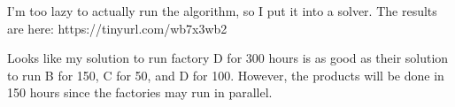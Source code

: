 \documentclass{article}
\begin{document}
I'm too lazy to actually run the algorithm, so I put it into a solver.  The results are here:  https://tinyurl.com/wb7x3wb2

Looks like my solution to run factory D for 300 hours is as good as their solution to run B for 150, C for 50, and D for 100.  However, the products will be done in 150 hours since the factories may run in parallel.
\end{document}
